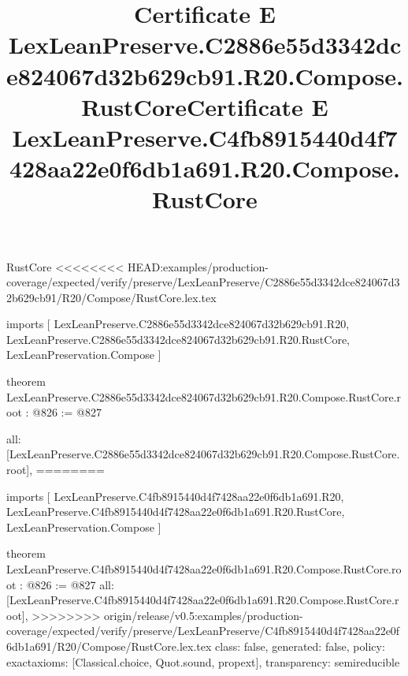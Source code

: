 \begin{lexlean}{RustCore}
<<<<<<<< HEAD:examples/production-coverage/expected/verify/preserve/LexLeanPreserve/C2886e55d3342dce824067d32b629cb91/R20/Compose/RustCore.lex.tex
\title{Certificate E LexLeanPreserve.C2886e55d3342dce824067d32b629cb91.R20.Compose.RustCore}
\begin{coremodule}
imports [
  LexLeanPreserve.C2886e55d3342dce824067d32b629cb91.R20,
  LexLeanPreserve.C2886e55d3342dce824067d32b629cb91.R20.RustCore,
  LexLeanPreservation.Compose
]

theorem LexLeanPreserve.C2886e55d3342dce824067d32b629cb91.R20.Compose.RustCore.root : @826 := @827 {
  all: [LexLeanPreserve.C2886e55d3342dce824067d32b629cb91.R20.Compose.RustCore.root],
========
\title{Certificate E LexLeanPreserve.C4fb8915440d4f7428aa22e0f6db1a691.R20.Compose.RustCore}
\begin{coremodule}
imports [
  LexLeanPreserve.C4fb8915440d4f7428aa22e0f6db1a691.R20,
  LexLeanPreserve.C4fb8915440d4f7428aa22e0f6db1a691.R20.RustCore,
  LexLeanPreservation.Compose
]

theorem LexLeanPreserve.C4fb8915440d4f7428aa22e0f6db1a691.R20.Compose.RustCore.root : @826 := @827 {
  all: [LexLeanPreserve.C4fb8915440d4f7428aa22e0f6db1a691.R20.Compose.RustCore.root],
>>>>>>>> origin/release/v0.5:examples/production-coverage/expected/verify/preserve/LexLeanPreserve/C4fb8915440d4f7428aa22e0f6db1a691/R20/Compose/RustCore.lex.tex
  class: false,
  generated: false,
  policy: exact{axioms: [Classical.choice, Quot.sound, propext]},
  transparency: semireducible
}


\end{coremodule}}
\end{coremodule}
\end{lexlean}
